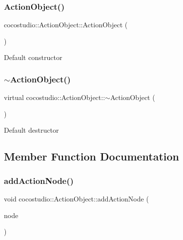 \subsubsection{\texorpdfstring{Action\+Object()}{ActionObject()}\hspace{0.1cm}{\footnotesize\ttfamily [2/2]}}
{\footnotesize\ttfamily cocostudio\+::\+Action\+Object\+::\+Action\+Object (\begin{DoxyParamCaption}{ }\end{DoxyParamCaption})}

Default constructor \mbox{\label{classcocostudio_1_1ActionObject_ac843d687e85085763fd8c8b7c6db2278}} 
\subsubsection{\texorpdfstring{$\sim$\+Action\+Object()}{~ActionObject()}\hspace{0.1cm}{\footnotesize\ttfamily [2/2]}}
{\footnotesize\ttfamily virtual cocostudio\+::\+Action\+Object\+::$\sim$\+Action\+Object (\begin{DoxyParamCaption}{ }\end{DoxyParamCaption})\hspace{0.3cm}{\ttfamily [virtual]}}

Default destructor 

\subsection{Member Function Documentation}
\mbox{\label{classcocostudio_1_1ActionObject_a8ab2a16c12741039440d78629bda657a}} 
\subsubsection{\texorpdfstring{add\+Action\+Node()}{addActionNode()}\hspace{0.1cm}{\footnotesize\ttfamily [1/2]}}
{\footnotesize\ttfamily void cocostudio\+::\+Action\+Object\+::add\+Action\+Node (\begin{DoxyParamCaption}\item[{\hyperlink{classcocostudio_1_1ActionNode}{Action\+Node} $\ast$}]{node }\end{DoxyParamCaption})}

